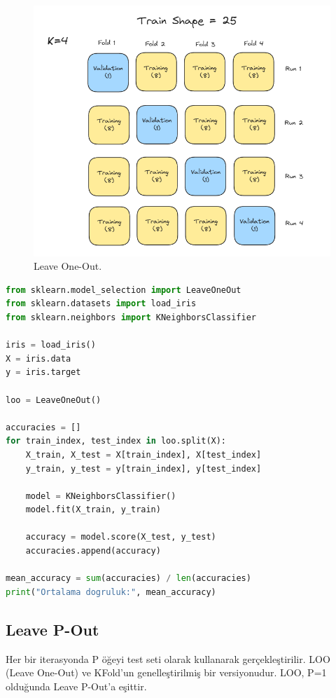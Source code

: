 \begin{figure}[h]
    \centering
    \includegraphics[width=1\textwidth]{images/leave_one_out_structure.png}
    \caption{Leave One-Out.}
    \label{fig:enter-label}
\end{figure}

\begin{lstlisting}[language=Python, caption=Scikit-learn'de Leave One-Out örneği.]
from sklearn.model_selection import LeaveOneOut
from sklearn.datasets import load_iris
from sklearn.neighbors import KNeighborsClassifier

iris = load_iris()
X = iris.data
y = iris.target

loo = LeaveOneOut()

accuracies = []
for train_index, test_index in loo.split(X):
    X_train, X_test = X[train_index], X[test_index]
    y_train, y_test = y[train_index], y[test_index]
    
    model = KNeighborsClassifier()
    model.fit(X_train, y_train)
    
    accuracy = model.score(X_test, y_test)
    accuracies.append(accuracy)

mean_accuracy = sum(accuracies) / len(accuracies)
print("Ortalama dogruluk:", mean_accuracy)
\end{lstlisting}

\subsection{Leave P-Out}
Her bir iterasyonda P öğeyi test seti olarak kullanarak gerçekleştirilir. LOO (Leave One-Out) ve KFold'un genelleştirilmiş bir versiyonudur. LOO, P=1 olduğunda Leave P-Out'a eşittir.

